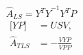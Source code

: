   \begin{equation}
       \hat{A}_{LS}={{Y^TY}^{-1} Y^TP}
 \label{eq:LSCO}
 \end{equation}
\begin{equation}
  \begin{aligned}
    \lbrack Y P\rbrack &= U S V , \\
    \hat{A}_{TLS} &= -\frac{VYP}{VPP}
 \label{eq:TLSCO}
  \end{aligned}
 \end{equation}


